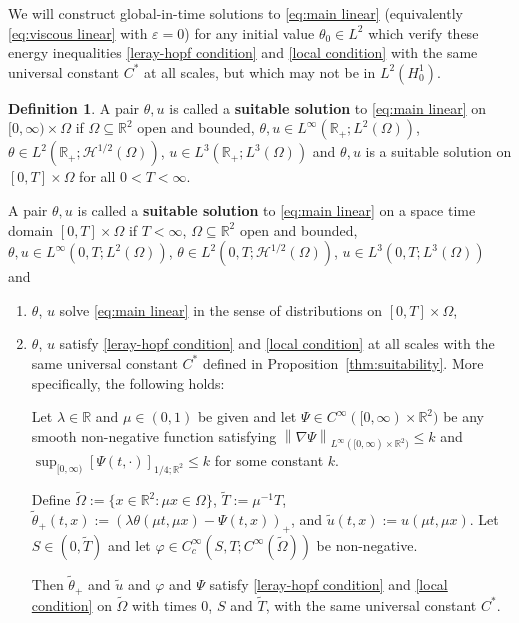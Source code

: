 \documentclass[11pt]{amsart}
\theoremstyle{remark}
\theoremstyle{definition}
\newtheorem{definition}{Definition}
\newcommand{\R}{\mathbb{R}}
\newcommand{\eps}{\varepsilon}
\newcommand{\norm}[1]{\left\lVert#1\right\rVert}
\newcommand{\bracket}[1]{\left[ #1 \right]}
\newcommand{\grad}{\nabla}
\newcommand{\n}{^{-1}}
\newcommand{\Ctest}{C_c^\infty}
\newcommand{\HD}{\mathcal{H}}
\newcommand{\Csuit}{C^\ast}
\begin{document}
We will construct global-in-time solutions to \eqref{eq:main linear} (equivalently \eqref{eq:viscous linear} with $\eps = 0$) for any initial value $\theta_0 \in L^2$ which verify these energy inequalities \eqref{leray-hopf condition} and \eqref{local condition} with the same universal constant $\Csuit$ at all scales, but which may not be in $L^2(H_0^1)$.  
\begin{definition}
A pair $\theta, u$ is called a \textbf{suitable solution} to \eqref{eq:main linear} on $[0,\infty) \times \Omega$ if $\Omega \subseteq \R^2$ open and bounded, $\theta,u \in L^\infty(\R_+;L^2(\Omega))$, $\theta \in L^2(\R_+;\HD^{1/2}(\Omega))$, $u \in L^3(\R_+; L^3(\Omega))$ and $\theta, u$ is a suitable solution on $[0,T]\times\Omega$ for all $0 < T < \infty$.  

A pair $\theta, u$ is called a \textbf{suitable solution} to \eqref{eq:main linear} on a space time domain $[0,T]\times \Omega$ if $T <\infty$, $\Omega \subseteq\R^2$ open and bounded,  $\theta,u \in L^\infty(0,T;L^2(\Omega))$, $\theta \in L^2(0,T;\HD^{1/2}(\Omega))$, $u \in L^3(0,T; L^3(\Omega))$ and
\begin{enumerate}
\item $\theta$, $u$ solve \eqref{eq:main linear} in the sense of distributions on $[0,T]\times\Omega$, \\
\item $\theta$, $u$ satisfy \eqref{leray-hopf condition} and \eqref{local condition} at all scales with the same universal constant $\Csuit$ defined in Proposition~\ref{thm:suitability}.  More specifically, the following holds:

Let $\lambda \in \R$ and $\mu \in (0,1)$ be given and let $\Psi \in C^\infty([0,\infty)\times \R^2)$ be any smooth non-negative function satisfying $\norm{\grad\Psi}_{L^\infty([0,\infty)\times\R^2)} \leq k$ and $\sup_{[0,\infty)} \bracket{\Psi(t,\cdot)}_{1/4; \R^2} \leq k$ for some constant $k$.  

Define $\tilde{\Omega} := \{x \in \R^2: \mu x \in \Omega\}$, $\tilde{T}:= \mu\n T$, $\tilde{\theta}_+(t,x) := (\lambda \theta(\mu t, \mu x)-\Psi(t, x))_+$, and $\tilde{u}(t,x):= u(\mu t, \mu x)$.  Let $S \in (0,\tilde{T})$ and let $\varphi \in \Ctest(S,T;C^\infty(\tilde{\Omega}))$ be non-negative.  

Then $\tilde{\theta}_+$ and $\tilde{u}$ and $\varphi$ and $\Psi$ satisfy \eqref{leray-hopf condition} and \eqref{local condition} on $\tilde{\Omega}$ with times 0, $S$ and $\tilde{T}$, with the same universal constant $\Csuit$.  
\end{enumerate}
\end{definition}
\end{document}

